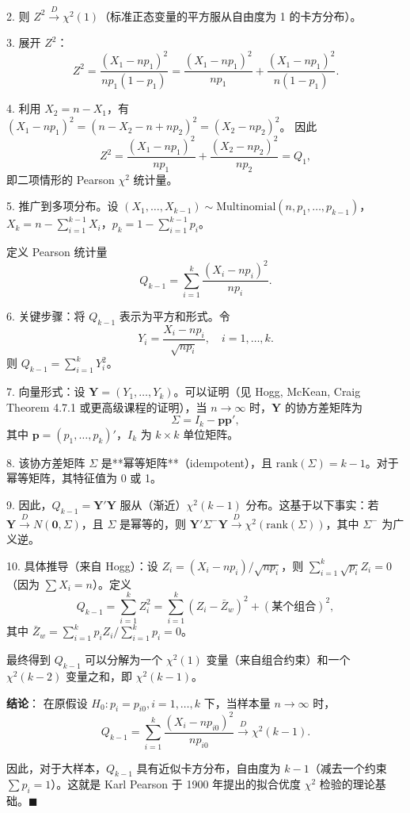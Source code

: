 2. 则 $Z^2 \xrightarrow{D} \chi^2(1)$（标准正态变量的平方服从自由度为 1 的卡方分布）。

3. 展开 $Z^2$：
\[
Z^2 = \frac{(X_1 - np_1)^2}{np_1(1-p_1)} = \frac{(X_1 - np_1)^2}{np_1} + \frac{(X_1 - np_1)^2}{n(1-p_1)}.
\]

4. 利用 $X_2 = n - X_1$，有 $(X_1 - np_1)^2 = (n - X_2 - n + np_2)^2 = (X_2 - np_2)^2$。
因此
\[
Z^2 = \frac{(X_1 - np_1)^2}{np_1} + \frac{(X_2 - np_2)^2}{np_2} = Q_1,
\]
即二项情形的 Pearson $\chi^2$ 统计量。

5. 推广到多项分布。设 $(X_1, \ldots, X_{k-1}) \sim \text{Multinomial}(n, p_1, \ldots, p_{k-1})$，$X_k = n - \sum_{i=1}^{k-1} X_i$，$p_k = 1 - \sum_{i=1}^{k-1} p_i$。

定义 Pearson 统计量
\[
Q_{k-1} = \sum_{i=1}^k \frac{(X_i - np_i)^2}{np_i}.
\]

6. 关键步骤：将 $Q_{k-1}$ 表示为平方和形式。令
\[
Y_i = \frac{X_i - np_i}{\sqrt{np_i}}, \quad i = 1, \ldots, k.
\]
则 $Q_{k-1} = \sum_{i=1}^k Y_i^2$。

7. 向量形式：设 $\mathbf{Y} = (Y_1, \ldots, Y_k)$。可以证明（见 Hogg, McKean, Craig Theorem 4.7.1 或更高级课程的证明），当 $n \to \infty$ 时，$\mathbf{Y}$ 的协方差矩阵为
\[
\Sigma = I_k - \mathbf{p}\mathbf{p}',
\]
其中 $\mathbf{p} = (p_1, \ldots, p_k)'$，$I_k$ 为 $k \times k$ 单位矩阵。

8. 该协方差矩阵 $\Sigma$ 是**幂等矩阵**（idempotent），且 $\text{rank}(\Sigma) = k - 1$。对于幂等矩阵，其特征值为 0 或 1。

9. 因此，$Q_{k-1} = \mathbf{Y}'\mathbf{Y}$ 服从（渐近）$\chi^2(k-1)$ 分布。这基于以下事实：若 $\mathbf{Y} \xrightarrow{D} N(\mathbf{0}, \Sigma)$，且 $\Sigma$ 是幂等的，则 $\mathbf{Y}'\Sigma^-\mathbf{Y} \xrightarrow{D} \chi^2(\text{rank}(\Sigma))$，其中 $\Sigma^-$ 为广义逆。

10. 具体推导（来自 Hogg）：设 $Z_i = (X_i - np_i) / \sqrt{np_i}$，则 $\sum_{i=1}^k \sqrt{p_i} Z_i = 0$（因为 $\sum X_i = n$）。定义
\[
Q_{k-1} = \sum_{i=1}^k Z_i^2 = \sum_{i=1}^k (Z_i - \bar{Z}_w)^2 + (\text{某个组合})^2,
\]
其中 $\bar{Z}_w = \sum_{i=1}^k p_i Z_i / \sum_{i=1}^k p_i = 0$。

最终得到 $Q_{k-1}$ 可以分解为一个 $\chi^2(1)$ 变量（来自组合约束）和一个 $\chi^2(k-2)$ 变量之和，即 $\chi^2(k-1)$。

\textbf{结论}：
在原假设 $H_0: p_i = p_{i0}, i = 1, \ldots, k$ 下，当样本量 $n \to \infty$ 时，
\[
Q_{k-1} = \sum_{i=1}^k \frac{(X_i - np_{i0})^2}{np_{i0}} \xrightarrow{D} \chi^2(k-1).
\]

因此，对于大样本，$Q_{k-1}$ 具有近似卡方分布，自由度为 $k-1$（减去一个约束 $\sum p_i = 1$）。这就是 Karl Pearson 于 1900 年提出的拟合优度 $\chi^2$ 检验的理论基础。$\blacksquare$

